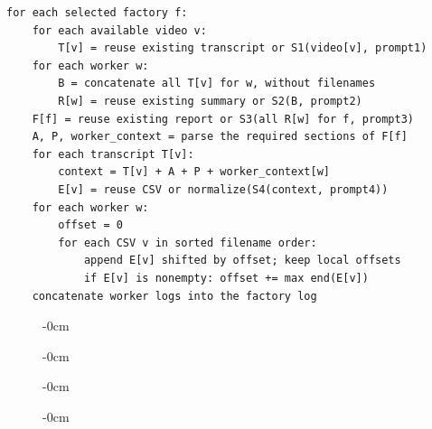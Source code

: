 \begin{lstlisting}[emph={S1,S2,S3,S4,S5},emphstyle=\fontfamily{pcr}\bfseries,float=!b,caption={Algorithm 1: implemented dependency order. API retries surround requests; this pseudocode does not add windowing or new validation.},label={alg:pipeline}]
for each selected factory f:
    for each available video v:
        T[v] = reuse existing transcript or S1(video[v], prompt1)
    for each worker w:
        B = concatenate all T[v] for w, without filenames
        R[w] = reuse existing summary or S2(B, prompt2)
    F[f] = reuse existing report or S3(all R[w] for f, prompt3)
    A, P, worker_context = parse the required sections of F[f]
    for each transcript T[v]:
        context = T[v] + A + P + worker_context[w]
        E[v] = reuse CSV or normalize(S4(context, prompt4))
    for each worker w:
        offset = 0
        for each CSV v in sorted filename order:
            append E[v] shifted by offset; keep local offsets
            if E[v] is nonempty: offset += max end(E[v])
    concatenate worker logs into the factory log
\end{lstlisting}

\begin{figure}[!b]\begin{adjustwidth}{-\extralength}{0cm}

\end{adjustwidth}\end{figure}

\begin{nextpagetopfloat}
\begin{figure}[!t]\begin{adjustwidth}{-\extralength}{0cm}

\end{adjustwidth}\end{figure}

\begin{figure}[!t]\begin{adjustwidth}{-\extralength}{0cm}

\end{adjustwidth}\end{figure}

\begin{figure}[!t]\begin{adjustwidth}{-\extralength}{0cm}

\end{adjustwidth}\end{figure}

\end{nextpagetopfloat}


